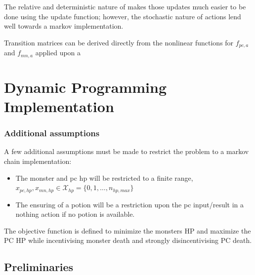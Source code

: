 \documentclass[letterpaper, 10 pt, conference]{ieeeconf}
\begin{document}
The relative and deterministic nature of makes those updates much easier to be done using the update function; however, the stochastic nature of actions lend well towards a markov implementation.

Transition matrices can be derived directly from the nonlinear functions for $f_{pc,a}$ and $f_{mn,a}$ applied upon a 




\section{Dynamic Programming Implementation}








\subsubsection{Additional assumptions}
A few additional assumptions must be made to restrict the problem to a markov chain implementation:
\begin{itemize}
    \item The monster and pc hp will be restricted to a finite range, $x_{pc,hp},x_{mn,hp} \in \mathcal{X}_{hp} = \{0,1,\dots, n_{hp,max}\}$
    \item The ensuring of a potion will be a restriction upon the pc input/result in a nothing action if no potion is available.
\end{itemize}







The objective function is defined to minimize the monsters HP and maximize the PC HP while incentivising monster death and strongly disincentivising PC death.



\subsection{Preliminaries}








\end{document}
